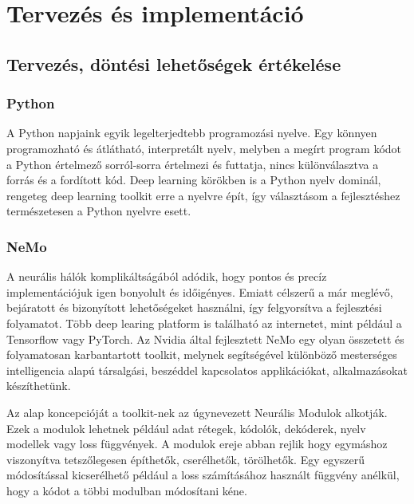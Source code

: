 \chapter{Tervezés és implementáció}

\section{Tervezés, döntési lehetőségek értékelése}

\subsection{Python}

A Python napjaink egyik legelterjedtebb programozási nyelve. Egy könnyen programozható és átlátható, interpretált nyelv, melyben a megírt program kódot a Python értelmező sorról-sorra értelmezi és futtatja, nincs különválasztva a forrás és a fordított kód. Deep learning körökben is a Python nyelv dominál, rengeteg deep learning toolkit erre a nyelvre épít, így választásom a fejlesztéshez természetesen a Python nyelvre esett.

\subsection{NeMo}

A neurális hálók komplikáltságából adódik, hogy pontos és precíz implementációjuk igen bonyolult és időigényes. Emiatt célszerű a már meglévő, bejáratott és bizonyított lehetőségeket használni, így felgyorsítva a fejlesztési folyamatot. Több deep learing platform is található az internetet, mint például a Tensorflow vagy PyTorch. Az Nvidia által fejlesztett NeMo egy olyan összetett és folyamatosan karbantartott toolkit, melynek segítségével különböző mesterséges intelligencia alapú társalgási, beszéddel kapcsolatos applikációkat, alkalmazásokat készíthetünk.


Az alap koncepcióját a toolkit-nek az úgynevezett Neurális Modulok alkotják. Ezek a modulok lehetnek például adat rétegek, kódolók, dekóderek, nyelv modellek vagy loss függvények. A modulok ereje abban rejlik hogy egymáshoz viszonyítva tetszőlegesen építhetők, cserélhetők, törölhetők. Egy egyszerű módosítással kicserélhető például a loss számításához használt függvény anélkül, hogy a kódot a többi modulban módosítani kéne.

